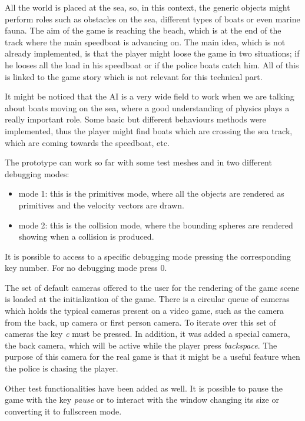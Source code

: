 \documentclass[]{article}
\begin{document}
All the world is placed at the sea, so, in this context, the generic objects might perform roles such as obstacles on the sea, different types of boats or even marine fauna. The aim of the game is reaching the beach, which is at the end of the track where the main speedboat is advancing on. The main idea, which is not already implemented, is that the player might loose the game in two situations; if he looses all the load in his speedboat or if the police boats catch him. All of this is linked to the game story which is not relevant for this technical part.

It might be noticed that the AI is a very wide field to work when we are talking about boats moving on the sea, where a good understanding of physics plays a really important role. Some basic but different behaviours methods were implemented, thus the player might find boats which are crossing the sea track, which are coming towards the speedboat, etc. 

The prototype can work so far with some test meshes and in two different debugging modes:

\begin{itemize}
\item mode 1: this is the primitives mode, where all the objects are rendered as primitives and the velocity vectors are drawn.
\item mode 2: this is the collision mode, where the bounding spheres are rendered showing when a collision is produced.
\end{itemize}

It is possible to access to a specific debugging mode pressing the corresponding key number. For no debugging mode press 0.

The set of default cameras offered to the user for the rendering of the game scene is loaded at the initialization of the game. There is a circular queue of cameras which holds the typical cameras present on a video game, such as the camera from the back, up camera or first person camera. To iterate over this set of cameras the key \emph{c} must be pressed. In addition, it was added a special camera, the back camera, which will be active while the player press \emph{backspace}. The purpose of this camera for the real game is that it might be a useful feature when the police is chasing the player.

Other test functionalities have been added as well. It is possible to pause the game with the key \emph{pause} or to interact with the window changing its size or converting it to fullscreen mode.
\end{document}
